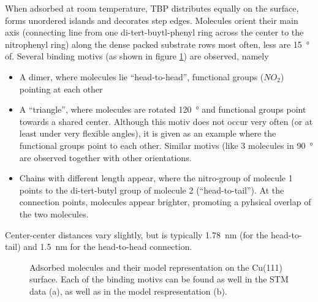 When adsorbed at room temperature, TBP distributes equally on the surface, forms unordered islands and decorates step edges. Molecules orient their main axis (connecting line from one di-tert-buytl-phenyl ring across the center to the nitrophenyl ring) along the dense packed substrate rows most often, less are \SI{15}{\degree} of. Several binding motivs (as shown in figure \ref{fig:binding-motivs-TBP-Cu111}) are observed, namely
\begin{itemize}
 \item A dimer, where molecules lie ``head-to-head'', functional groups ($NO_2$) pointing at each other
 \item A ``triangle'', where molecules are rotated \SI{120}{\degree} and functional groups point towards a shared center. Although this motiv does not occur very often (or at least under very flexible angles), it is given as an example where the functional groups point to each other. Similar motivs (like 3 molecules in \SI{90}{\degree} are observed together with other orientations. 
 \item Chains with different length appear, where the nitro-group of molecule 1 points to the di-tert-butyl group of molecule 2 (``head-to-tail''). At the connection points, molecules appear brighter, promoting a pyhsical overlap of the two molecules.
\end{itemize}

Center-center distances vary slightly, but is typically \SI{1.78}{\nano \meter} (for the head-to-tail) and \SI{1.5}{\nano \meter} for the head-to-head connection. 

\begin{figure}[ht]
 \centering
\caption{Adsorbed molecules and their model representation on the Cu(111) surface. Each of the binding motivs can be found as well in the STM data (a), as well as in the model respresentation (b).}
\label{fig:binding-motivs-TBP-Cu111}
\end{figure}

